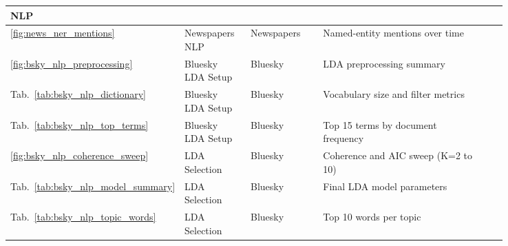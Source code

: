 \begin{longtable}{|p{0.05\linewidth}|p{0.14\linewidth}|p{0.16\linewidth}|p{0.43\linewidth}|p{0.06\linewidth}|}
\multicolumn{5}{|l|}{\rule[-0.3em]{0pt}{1.2em}\textcolor{textprimary}{\sffamily\bfseries\small\enspace 4 \enspace NLP}} \\
\hline
\textcolor{textmuted}{\small\ref{fig:news_ner_mentions}}           & \textcolor{textmuted}{\small Newspapers NLP}      & \textcolor{textmuted}{\small Newspapers}      & \textcolor{textmuted}{\small Named-entity mentions over time}          & \textcolor{textmuted}{\small\pageref{fig:news_ner_mentions}} \\\hline
\textcolor{textmuted}{\small\ref{fig:bsky_nlp_preprocessing}}      & \textcolor{textmuted}{\small Bluesky LDA Setup}   & \textcolor{textmuted}{\small Bluesky}         & \textcolor{textmuted}{\small LDA preprocessing summary}                & \textcolor{textmuted}{\small\pageref{fig:bsky_nlp_preprocessing}} \\\hline
\textcolor{textmuted}{\small Tab.~\ref{tab:bsky_nlp_dictionary}}   & \textcolor{textmuted}{\small Bluesky LDA Setup}   & \textcolor{textmuted}{\small Bluesky}         & \textcolor{textmuted}{\small Vocabulary size and filter metrics}       & \textcolor{textmuted}{\small\pageref{tab:bsky_nlp_dictionary}} \\\hline
\textcolor{textmuted}{\small Tab.~\ref{tab:bsky_nlp_top_terms}}    & \textcolor{textmuted}{\small Bluesky LDA Setup}   & \textcolor{textmuted}{\small Bluesky}         & \textcolor{textmuted}{\small Top 15 terms by document frequency}       & \textcolor{textmuted}{\small\pageref{tab:bsky_nlp_top_terms}} \\\hline
\textcolor{textmuted}{\small\ref{fig:bsky_nlp_coherence_sweep}}    & \textcolor{textmuted}{\small LDA Selection}       & \textcolor{textmuted}{\small Bluesky}         & \textcolor{textmuted}{\small Coherence and AIC sweep (K=2 to 10)}      & \textcolor{textmuted}{\small\pageref{fig:bsky_nlp_coherence_sweep}} \\\hline
\textcolor{textmuted}{\small Tab.~\ref{tab:bsky_nlp_model_summary}}& \textcolor{textmuted}{\small LDA Selection}       & \textcolor{textmuted}{\small Bluesky}         & \textcolor{textmuted}{\small Final LDA model parameters}               & \textcolor{textmuted}{\small\pageref{tab:bsky_nlp_model_summary}} \\\hline
\textcolor{textmuted}{\small Tab.~\ref{tab:bsky_nlp_topic_words}}  & \textcolor{textmuted}{\small LDA Selection}       & \textcolor{textmuted}{\small Bluesky}         & \textcolor{textmuted}{\small Top 10 words per topic}                   & \textcolor{textmuted}{\small\pageref{tab:bsky_nlp_topic_words}} \\\hline

\end{longtable}
